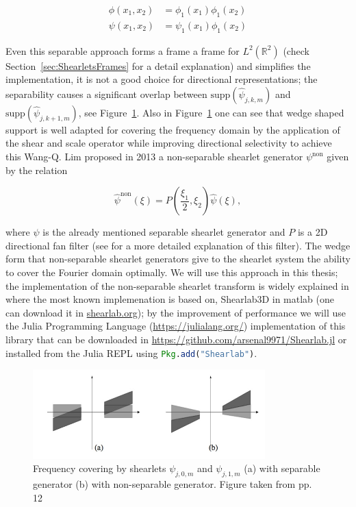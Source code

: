 $$
\begin{aligned}
\phi(x_1,x_2)&=\phi_1(x_1)\phi_1(x_2)\\
\psi(x_1,x_2)&=\psi_1(x_1)\phi_1(x_2)
\end{aligned}
$$

Even this separable approach forms a frame a frame for $L^2(\mathbb{R}^2)$ (check Section~\ref{sec:ShearletsFrames} for a detail explanation) and simplifies the implementation, it is not a good choice for directional representations; the separability causes a significant overlap between $\text{supp}(\hat{\psi}_{j,k,m})$ and $\text{supp}(\hat{\psi}_{j,k+1,m})$, see Figure~\ref{fig:separable_nonseparable}. Also in Figure~\ref{fig:separable_nonseparable} one can see that wedge shaped support is well adapted for covering the frequency domain by the application of the shear and scale operator while improving directional selectivity to achieve this Wang-Q. Lim proposed in 2013 a non-separable shearlet generator $\psi^{\text{non}}$ given by the relation

$$
\hat{\psi}^{\text{non}}(\xi)=P\left(\frac{\xi_1}{2},\xi_2\right)\hat{\psi}(\xi),
$$

where $\psi$ is the already mentioned separable shearlet generator and $P$ is a 2D directional fan filter (see \cite{Nonseparableshear} for a more detailed explanation of this filter). The wedge form that non-separable shearlet generators give to the shearlet system the ability to cover the Fourier domain optimally. We will use this approach in this thesis; the implementation of the non-separable shearlet transform is widely explained in \cite{Shearlab} where the most known implemenation is based on, Shearlab3D in matlab (one can download it in \url{shearlab.org}); by the improvement of performance we will use the Julia Programming Language (\url{https://julialang.org/}) implementation of this library that can be downloaded in \url{https://github.com/arsenal9971/Shearlab.jl} or installed from the Julia REPL using \lstinline[language=julia]{Pkg.add("Shearlab")}.

\begin{figure}[h!]
\centering
\includegraphics[width=0.8\textwidth]{./Diagrams/separable_nonseparable.jpg}
\caption{Frequency covering by shearlets $\psi_{j,0,m}$ and $\psi_{j,1,m}$ (a) with separable generator (b) with non-separable generator. Figure taken from \cite{Nonseparableshear} pp. 12}
\label{fig:separable_nonseparable}
\end{figure}

